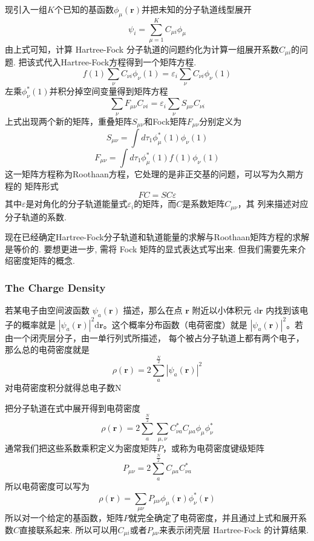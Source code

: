 \documentclass[fontset=none,12pt,a4paper]{ctexart}
\numberwithin{equation}{section}
\begin{document}
现引入一组$K$个已知的基函数${\phi_{\mu}(\mathbf{r})}$并把未知的分子轨道线型展开
\begin{equation}
  \psi_i=\sum_{\mu=1}^{K}C_{\mu i}\phi_{\mu}
\end{equation}
由上式可知，计算 Hartree-Fock 分子轨道的问题约化为计算一组展开系数${C_{\mu i}}$的问题.
把该式代入Hartree-Fock方程得到一个矩阵方程.
\begin{equation}
  f(1)\sum_{\nu}C_{\nu i}\phi_{\nu}(1)=\varepsilon_i\sum_{\nu}C_{\nu i}\phi_{\nu}(1)
\end{equation}
左乘$\phi_{\nu}^*(1)$并积分掉空间变量得到矩阵方程
\begin{equation}
  \sum_{\nu}F_{\mu\nu}C_{\nu i}=\varepsilon_i\sum_{\nu}S_{\mu\nu}C_{\nu i}
\end{equation}
上式出现两个新的矩阵，重叠矩阵$S_{\mu\nu}$和Fock矩阵$F_{\mu\nu}$分别定义为
\begin{equation}
  S_{\mu\nu}=\int d\tau_1\phi_{\mu}^*(1)\phi_{\nu}(1)
\end{equation}
\begin{equation}
  F_{\mu\nu}=\int d\tau_1\phi_{\mu}^*(1)f(1)\phi_{\nu}(1)
\end{equation}
这一矩阵方程称为Roothaan方程，它处理的是非正交基的问题，可以写为久期方程的
矩阵形式
\begin{equation}
   FC=SC\varepsilon
\end{equation}
其中$\varepsilon$是对角化的分子轨道能量式$\varepsilon_i$的矩阵，而$C$是系数矩阵$C_{\mu\nu}$，其
列来描述对应分子轨道的系数.

现在已经确定Hartree-Fock分子轨道和轨道能量的求解与Roothaan矩阵方程的求解是等价的.
要想更进一步, 需将 Fock 矩阵的显式表达式写出来. 但我们需要先来介绍密度矩阵的概念.
\subsubsection{The Charge Density}
若某电子由空间波函数 $\psi_a(\mathbf{r})$ 描述，那么在点 $\mathbf{r}$ 
附近以小体积元 $\mathrm{d}\mathbf{r}$ 内找到该电子的概率就是 
$|\psi_a(\mathbf{r})|^2\mathrm{d}\mathbf{r}$。这个概率分布函数（电荷密度）就是
$|\psi_a(\mathbf{r})|^2$。若由一个闭壳层分子，由一单行列式所描述，
每个被占分子轨道上都有两个电子，那么总的电荷密度就是
\begin{equation}
  \rho(\mathbf{r})=2\sum_a^{\frac{N}{2}}|\psi_a(\mathbf{r})|^2
\end{equation}
对电荷密度积分就得总电子数N

把分子轨道在式中展开得到电荷密度
\begin{equation}
  \rho(\mathbf{r})=2\sum_a^{\frac{N}{2}}\sum_{\mu,\nu}C_{\nu a}^*C_{\mu a}\phi_{\mu}\phi_{\nu}^*
\end{equation}
通常我们把这些系数乘积定义为密度矩阵$P$，或称为电荷密度键级矩阵
\begin{equation}
  P_{\mu\nu}=2\sum_a^{\frac{N}{2}}C_{\mu a}C_{\nu a}^*
\end{equation}
所以电荷密度可以写为
\begin{equation}
  \rho(\mathbf{r})=\sum_{\mu\nu}P_{\mu\nu}\phi_{\mu}(\mathbf{r})\phi_{\nu}^*(\mathbf{r})
\end{equation}
所以对一个给定的基函数，矩阵$P$就完全确定了电荷密度，并且通过上式和展开系数$C$直接联系起来.
所以可以用$C_{\mu i}$或者$P_{\mu\nu}$来表示闭壳层  Hartree-Fock 的计算结果.
\end{document}
